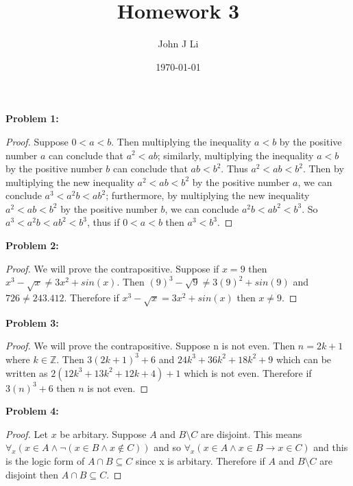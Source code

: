 \documentclass{article}
\title{Homework 3}
\date{\today}
\author{John J Li}
\begin{document}
    \maketitle
    \newpage


    \textbf{Problem 1:}

    \begin{proof}
        Suppose $0<a<b$. 
        Then multiplying the inequality $a<b$ by the positive number $a$ can
        conclude that $a^2<ab$; similarly, multiplying the inequality $a<b$ by the positive
        number $b$ can conclude that $ab<b^2$. 
        Thus $a^2<ab<b^2$. Then by multiplying the
        new inequality $a^2<ab<b^2$ by the positive number $a$, we can conclude $a^3<a^2b<ab^2$;
        furthermore, by multiplying the
        new inequality $a^2<ab<b^2$ by the positive number $b$, we can conclude $a^2b<ab^2<b^3$.
        So $a^3<a^2b<ab^2<b^3$, thus if $0<a<b$ then $a^3<b^3$.
    \end{proof}


    \textbf{Problem 2:}

    \begin{proof}
        We will prove the contrapositive.
        Suppose if $x=9$ then $x^3-\sqrt{x}\neq 3x^2+sin(x)$. Then $(9)^3-\sqrt{9}\neq 3(9)^2+sin(9)$
        and $726 \neq 243.412$. Therefore if $x^3-\sqrt{x}= 3x^2+sin(x)$ then
        $x\neq 9$.
    \end{proof}


    \textbf{Problem 3:}

    \begin{proof}
        We will prove the contrapositive.
        Suppose n is not even. Then $n = 2k + 1$ where $k \in \mathbb{Z}$.
        Then $3(2k+1)^3 + 6$ and $24k^3 + 36k^2 + 18k^2 + 9$ which can be written as
        $2(12k^3 + 13k^2 + 12k + 4) + 1$ which is not even. Therefore if $3(n)^3 + 6$ then
        $n$ is not even.
    \end{proof}


    \textbf{Problem 4:}

    \begin{proof}
        Let $x$ be arbitary. Suppose $A$ and $B\setminus C$ are disjoint. This means $\forall_x (x \in A \land \neg(x\in B \land x \notin C))$
        and so $\forall_x (x \in A \land x \in B \rightarrow x \in C)$ and this is 
        the logic form of $A\cap B \subseteq C$ since x is arbitary. Therefore if $A$ and $B\setminus C$ are disjoint
        then $A\cap B \subseteq C$.
    \end{proof}


    
\end{document}
